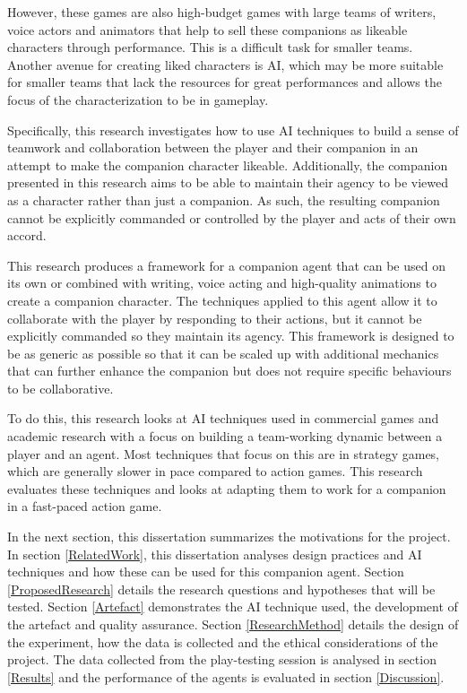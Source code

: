 \documentclass{IEEEtran}
\begin{document}
However, these games are also high-budget games with large teams of writers, voice actors and animators that help to sell these companions as likeable characters through performance. This is a difficult task for smaller teams. Another avenue for creating liked characters is AI, which may be more suitable for smaller teams that lack the resources for great performances and allows the focus of the characterization to be in gameplay.

Specifically, this research investigates how to use AI techniques to build a sense of teamwork and collaboration between the player and their companion in an attempt to make the companion character likeable. Additionally, the companion presented in this research aims to be able to maintain their agency to be viewed as a character rather than just a companion. As such, the resulting companion cannot be explicitly commanded or controlled by the player and acts of their own accord.

This research produces a framework for a companion agent that can be used on its own or combined with writing, voice acting and high-quality animations to create a companion character. The techniques applied to this agent allow it to collaborate with the player by responding to their actions, but it cannot be explicitly commanded so they maintain its agency. This framework is designed to be as generic as possible so that it can be scaled up with additional mechanics that can further enhance the companion but does not require specific behaviours to be collaborative.


To do this, this research looks at AI techniques used in commercial games and academic research with a focus on building a team-working dynamic between a player and an agent. Most techniques that focus on this are in strategy games, which are generally slower in pace compared to action games. This research evaluates these techniques and looks at adapting them to work for a companion in a fast-paced action game.

In the next section, this dissertation summarizes the motivations for the project. In section \ref{RelatedWork}, this dissertation analyses design practices and AI techniques and how these can be used for this companion agent. Section \ref{ProposedResearch} details the research questions and hypotheses that will be tested. Section \ref{Artefact} demonstrates the AI technique used, the development of the artefact and quality assurance. Section \ref{ResearchMethod} details the design of the experiment, how the data is collected and the ethical considerations of the project. The data collected from the play-testing session is analysed in section \ref{Results} and the performance of the agents is evaluated in section \ref{Discussion}.
\end{document}
